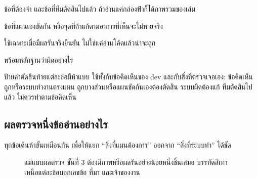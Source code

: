 \begin{keybox}[title={ฟ้า --- ข้อสรุปหรือข้อตัดสินที่ใช้ต่อทั้งเล่ม}]
ข้อที่ต้องจำ และข้อที่ทีมตัดสินไปแล้ว ถ้าอ่านแค่กล่องฟ้าก็ได้ภาพรวมของเล่ม
\end{keybox}
\begin{warnbox}[title={ส้ม --- ต้องตัดสินใจ หรือกับดักที่ทำให้แก้ผิดจุด}]
ข้อที่แผนเองขัดกัน หรือจุดที่ถ้าแก้ตามอาการที่เห็นจะไม่หายจริง
\end{warnbox}
\begin{goodbox}[title={เขียว --- ตรวจกับระบบจริงแล้วว่าทำงานถูก}]
ใช้เฉพาะเมื่อมีผลรันจริงยืนยัน ไม่ใช่แค่อ่านโค้ดแล้วน่าจะถูก
\end{goodbox}
\begin{badbox}[title={แดง --- ผิดจริง และทำให้ผู้ใช้เห็นข้อมูลผิดหรือทำงานไม่ได้}]
พร้อมหลักฐานว่าผิดอย่างไร
\end{badbox}

ป้ายคำตัดสินท้ายแต่ละข้อมีห้าแบบ ใช้ทั้งกับข้อคิดเห็นของ dev และกับสิ่งที่ตรวจเจอเอง:
\vok{} ข้อคิดเห็นถูกหรือระบบทำงานตรงแผน \quad
\vpart{} ถูกบางส่วนหรือแผนขัดกันเองต้องตัดสิน \quad
\vbad{} ระบบผิดต้องแก้ \quad
\vdec{} ทีมตัดสินไปแล้ว \quad
\vno{} ไม่ควรทำตามข้อคิดเห็น

\subsection*{ผลตรวจหนึ่งข้ออ่านอย่างไร}

ทุกข้อเดินห้าขั้นเหมือนกัน เพื่อให้แยก ``สิ่งที่แผนต้องการ'' ออกจาก ``สิ่งที่ระบบทำ'' ได้ชัด

\begin{figure}[H]
\centering
{}
\caption{แม่แบบผลตรวจ ขั้นที่ 3 ต้องมีภาพหรือผลรันอย่างน้อยหนึ่งชิ้นเสมอ บรรทัดสีเทาเหนือแต่ละข้อบอกเลขข้อ ที่มา และเจ้าของงาน}
\end{figure}

